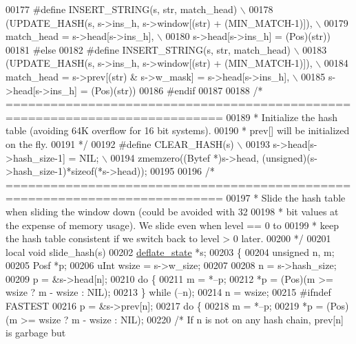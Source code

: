 \begin{DoxyCode}
00177 \textcolor{preprocessor}{#define INSERT\_STRING(s, str, match\_head) \(\backslash\)}
00178 \textcolor{preprocessor}{   (UPDATE\_HASH(s, s->ins\_h, s->window[(str) + (MIN\_MATCH-1)]), \(\backslash\)}
00179 \textcolor{preprocessor}{    match\_head = s->head[s->ins\_h], \(\backslash\)}
00180 \textcolor{preprocessor}{    s->head[s->ins\_h] = (Pos)(str))}
00181 \textcolor{preprocessor}{#else}
00182 \textcolor{preprocessor}{#define INSERT\_STRING(s, str, match\_head) \(\backslash\)}
00183 \textcolor{preprocessor}{   (UPDATE\_HASH(s, s->ins\_h, s->window[(str) + (MIN\_MATCH-1)]), \(\backslash\)}
00184 \textcolor{preprocessor}{    match\_head = s->prev[(str) & s->w\_mask] = s->head[s->ins\_h], \(\backslash\)}
00185 \textcolor{preprocessor}{    s->head[s->ins\_h] = (Pos)(str))}
00186 \textcolor{preprocessor}{#endif}
00187 
00188 \textcolor{comment}{/* ===========================================================================}
00189 \textcolor{comment}{ * Initialize the hash table (avoiding 64K overflow for 16 bit systems).}
00190 \textcolor{comment}{ * prev[] will be initialized on the fly.}
00191 \textcolor{comment}{ */}
00192 \textcolor{preprocessor}{#define CLEAR\_HASH(s) \(\backslash\)}
00193 \textcolor{preprocessor}{    s->head[s->hash\_size-1] = NIL; \(\backslash\)}
00194 \textcolor{preprocessor}{    zmemzero((Bytef *)s->head, (unsigned)(s->hash\_size-1)*sizeof(*s->head));}
00195 
00196 \textcolor{comment}{/* ===========================================================================}
00197 \textcolor{comment}{ * Slide the hash table when sliding the window down (could be avoided with 32}
00198 \textcolor{comment}{ * bit values at the expense of memory usage). We slide even when level == 0 to}
00199 \textcolor{comment}{ * keep the hash table consistent if we switch back to level > 0 later.}
00200 \textcolor{comment}{ */}
00201 local \textcolor{keywordtype}{void} slide\_hash(s)
00202     \hyperlink{structinternal__state}{deflate\_state} *s;
00203 \{
00204     \textcolor{keywordtype}{unsigned} n, m;
00205     Posf *p;
00206     uInt wsize = s->w\_size;
00207 
00208     n = s->hash\_size;
00209     p = &s->head[n];
00210     \textcolor{keywordflow}{do} \{
00211         m = *--p;
00212         *p = (Pos)(m >= wsize ? m - wsize : NIL);
00213     \} \textcolor{keywordflow}{while} (--n);
00214     n = wsize;
00215 \textcolor{preprocessor}{#ifndef FASTEST}
00216     p = &s->prev[n];
00217     \textcolor{keywordflow}{do} \{
00218         m = *--p;
00219         *p = (Pos)(m >= wsize ? m - wsize : NIL);
00220         \textcolor{comment}{/* If n is not on any hash chain, prev[n] is garbage but}

\end{DoxyCode}
